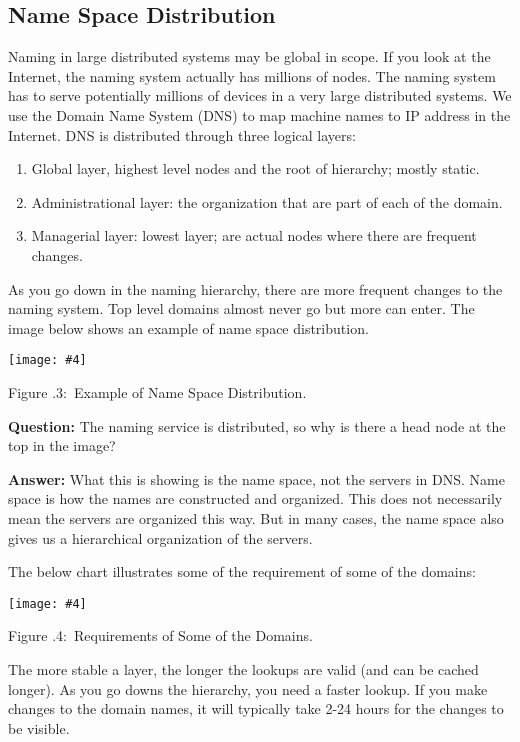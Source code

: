 \documentclass[twoside]{article}
\newcounter{lecnum}
\newcommand{\fig}[4]{
            \centerline{\texttt{[image: \#4]}}
            \begin{center}
            Figure \thelecnum.#1:~#3
            \end{center}
    }
\begin{document}
\subsection{Name Space Distribution}
Naming in large distributed systems may be global in scope. If you look at the Internet, the naming system actually has millions of nodes. The naming system has to serve potentially millions of devices in a very large distributed systems. We use the Domain Name System (DNS) to map machine names to IP address in the Internet. DNS is distributed through three logical layers:

\begin{enumerate}
    \item Global layer, highest level nodes and the root of hierarchy; mostly static.
    \item Administrational layer: the organization that are part of each of the domain.
    \item Managerial layer: lowest layer; are actual nodes where there are frequent changes.
\end{enumerate}

As you go down in the naming hierarchy, there are more frequent changes to the naming system. Top level domains almost never go but more can enter. The image below shows an example of name space distribution.

\fig{3}{0.6}{Example of Name Space Distribution.}{name_space_dist_example.png}

\textbf{Question: } The naming service is distributed, so why is there a head node at the top in the image?

\textbf{Answer: } What this is showing is the name space, not the servers in DNS. Name space is how the names are constructed and organized. This does not necessarily mean the servers are organized this way. But in many cases, the name space also gives us a hierarchical organization of the servers.

The below chart illustrates some of the requirement of some of the domains:

\fig{4}{0.5}{Requirements of Some of the Domains.}{requirement.png}

The more stable a layer, the longer the lookups are valid (and can be cached longer). As you go downs the hierarchy, you need a faster lookup. If you make changes to the domain names, it will typically take 2-24 hours for the changes to be visible.
\end{document}
